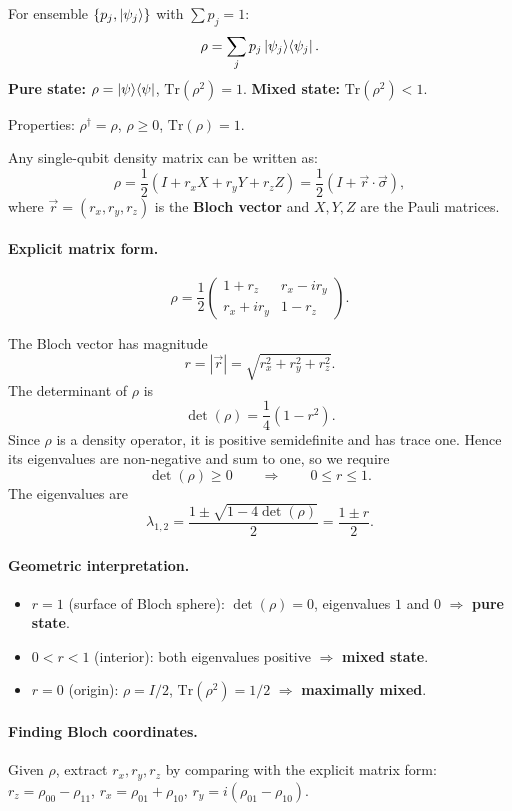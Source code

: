 \documentclass[10pt,a4paper]{article}
\begin{document}
\begin{tcolorbox}[defstyle, title={Definition}]
For ensemble $\{p_j,\ket{\psi_j}\}$ with $\sum p_j=1$:
\[
\rho=\sum_j p_j\ket{\psi_j}\!\bra{\psi_j}.
\]
\textbf{Pure state:} $\rho=\ket{\psi}\!\bra{\psi}$, $\mathrm{Tr}(\rho^2)=1$. \textbf{Mixed state:} $\mathrm{Tr}(\rho^2)<1$.

Properties: $\rho^\dagger=\rho$, $\rho\ge 0$, $\mathrm{Tr}(\rho)=1$.
\end{tcolorbox}

Any single-qubit density matrix can be written as:
\[
\rho=\frac{1}{2}(I+r_x X+r_y Y+r_z Z)=\frac{1}{2}(I+\vec{r}\cdot\vec{\sigma}),
\]
where $\vec{r}=(r_x,r_y,r_z)$ is the \textbf{Bloch vector} and $X,Y,Z$ are the Pauli matrices.

\paragraph{Explicit matrix form.}
\[
\rho=\frac{1}{2}\begin{pmatrix}1+r_z & r_x-ir_y\\r_x+ir_y & 1-r_z\end{pmatrix}.
\]

The Bloch vector has magnitude
\[
r=|\vec r|=\sqrt{r_x^2+r_y^2+r_z^2}.
\]
The determinant of $\rho$ is
\[
\det(\rho)=\frac{1}{4}(1-r^2).
\]
Since \(\rho\) is a density operator, it is positive semidefinite and has trace one. Hence its eigenvalues are non-negative and sum to one, so we require
\[
\det(\rho)\ge 0 \qquad\Longrightarrow\qquad 0\le r\le 1.
\]
The eigenvalues are
\[
\lambda_{1,2}
=
\frac{1\pm\sqrt{1-4\det(\rho)}}{2}
=
\frac{1\pm r}{2}.
\]

\paragraph{Geometric interpretation.}
\begin{itemize}[nosep]
\item $r=1$ (surface of Bloch sphere): $\det(\rho)=0$, eigenvalues $1$ and $0$ $\Rightarrow$ \textbf{pure state}.
\item $0<r<1$ (interior): both eigenvalues positive $\Rightarrow$ \textbf{mixed state}.
\item $r=0$ (origin): $\rho=I/2$, $\mathrm{Tr}(\rho^2)=1/2$ $\Rightarrow$ \textbf{maximally mixed}.
\end{itemize}

\paragraph{Finding Bloch coordinates.} Given $\rho$, extract $r_x,r_y,r_z$ by comparing with the explicit matrix form: $r_z=\rho_{00}-\rho_{11}$, $r_x=\rho_{01}+\rho_{10}$, $r_y=i(\rho_{01}-\rho_{10})$.
\end{document}
